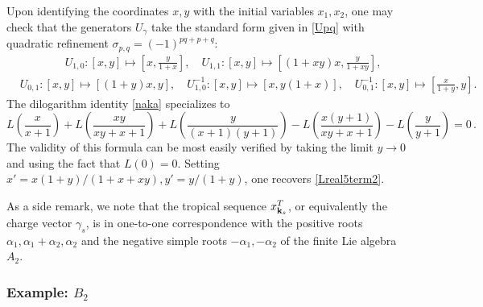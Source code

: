 \documentclass[12pt,reqno]{article}
\numberwithin{equation}{section}
\newcommand{\be}{\begin{equation}}
\newcommand{\ee}{\end{equation}}
\def\ind{s}
\numberwithin{equation}{section}
\begin{document}
Upon identifying the coordinates $x,y$ with the initial variables $x_1,x_2$,
one may check that the generators $U_\gamma$ take the standard
form given in \eqref{Upq} with quadratic refinement $\sigma_{p,q}=(-1)^{pq+p+q}$:
\be
\begin{split}
&
\qquad \qquad
U_{1,0}: [x,y]\mapsto [x,\frac{y}{1+x}] ,\quad
U_{1,1}: [x,y]\mapsto [(1+xy)x,\frac{y}{1+xy}] ,
\\
&
U_{0,1}: [x,y]\mapsto [(1+y)x,y] ,
\quad
U_{1,0}^{-1}: [x,y]\mapsto [x,y(1+x)] ,
\quad
U_{0,1}^{-1}: [x,y]\mapsto [\frac{x}{1+y},y] .
\end{split}
\ee
The dilogarithm identity \eqref{naka} specializes to
\be
L\left(\frac{x}{x+1}\right)+
L\left(\frac{x y}{x y+x+1}\right)
+L\left(\frac{y}{(x+1)(y+1)}\right)
-L\left(\frac{x (y+1)}{x y+x+1}\right)
   -L\left(\frac{y}{y+1}\right)=0 \, .
\ee
The validity of this formula can be most easily verified by taking the limit
$y\to 0$ and using the fact that $L(0)=0$. Setting $x'=x(1+y)/(1+x+xy), y'=y/(1+y)$, one recovers
\eqref{Lreal5term2}.



As a side remark, we
note that the tropical sequence $x^T_{{\bf k}_\ind}$, or equivalently the charge
vector $\gamma_\ind$, is in one-to-one correspondence with the positive
roots $\alpha_1, \alpha_1+\alpha_2, \alpha_2$ and the negative simple roots
$-\alpha_1, -\alpha_2$ of the finite Lie algebra $A_2$.


\subsubsection{Example: $B_2$}
\label{subsec-b2}
\end{document}
